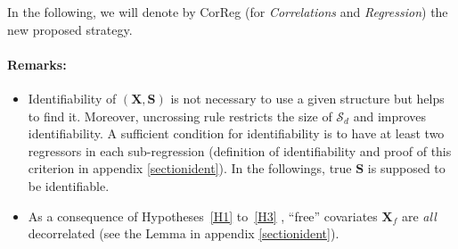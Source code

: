 \documentclass[12pt,a4paper]{report}
\begin{document}

In the following, we will denote by {\sc CorReg} (for {\it Correlations} and {\it Regression}) the new proposed strategy.

\paragraph{Remarks:} 
\begin{itemize}
\item Identifiability of $(\boldsymbol{X},\boldsymbol{S})$ is not necessary to use a given structure but helps to find it. Moreover, uncrossing rule restricts the size of $\mathcal{S}_d$ and improves identifiability. A sufficient condition for identifiability is to have at least two regressors in each sub-regression (definition of identifiability and proof of this criterion in appendix \ref{sectionident}). 
In the followings, true $\boldsymbol{S}$ is supposed to be identifiable.
\item As a consequence of Hypotheses~\ref{H1} to~\ref{H3} , ``free'' covariates $\boldsymbol{X}_f$ are {\it all} decorrelated (see the Lemma in appendix \ref{sectionident}).
\end{itemize}
\end{document}

